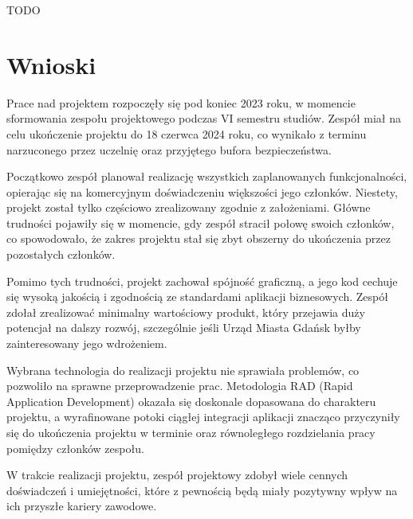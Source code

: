 TODO

\section{Wnioski}\label{sec:wnioski}
Prace nad projektem rozpoczęły się pod koniec 2023 roku, w momencie sformowania zespołu projektowego podczas VI semestru studiów.
Zespół miał na celu ukończenie projektu do 18 czerwca 2024 roku, co wynikało z terminu narzuconego przez uczelnię oraz przyjętego bufora bezpieczeństwa.

Początkowo zespół planował realizację wszystkich zaplanowanych funkcjonalności, opierając się na komercyjnym doświadczeniu większości jego członków.
Niestety, projekt został tylko częściowo zrealizowany zgodnie z założeniami.
Główne trudności pojawiły się w momencie, gdy zespół stracił połowę swoich członków, co spowodowało, że zakres projektu stał się zbyt obszerny do ukończenia przez pozostałych członków.

Pomimo tych trudności, projekt zachował spójność graficzną, a jego kod cechuje się wysoką jakością i zgodnością ze standardami aplikacji biznesowych.
Zespół zdołał zrealizować minimalny wartościowy produkt, który przejawia duży potencjał na dalszy rozwój, szczególnie jeśli Urząd Miasta Gdańsk byłby zainteresowany jego wdrożeniem.

Wybrana technologia do realizacji projektu nie sprawiała problemów, co pozwoliło na sprawne przeprowadzenie prac.
Metodologia RAD (Rapid Application Development) okazała się doskonale dopasowana do charakteru projektu, a wyrafinowane potoki ciągłej integracji aplikacji znacząco przyczyniły się do ukończenia projektu w terminie oraz równoległego rozdzielania pracy pomiędzy członków zespołu.

W trakcie realizacji projektu, zespół projektowy zdobył wiele cennych doświadczeń i umiejętności, które z pewnością będą miały pozytywny wpływ na ich przyszłe kariery zawodowe.
